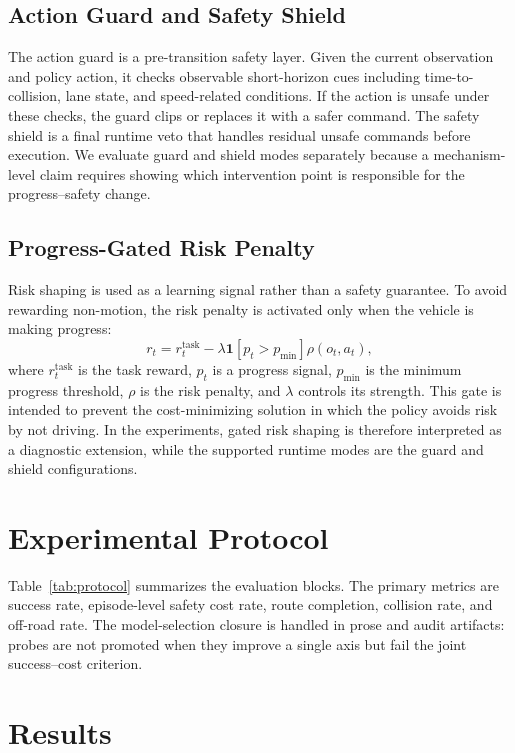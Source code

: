 \documentclass[conference,a4paper]{IEEEtran}
\begin{document}
\subsection{Action Guard and Safety Shield}
The action guard is a pre-transition safety layer. Given the current observation and policy action, it checks observable short-horizon cues including time-to-collision, lane state, and speed-related conditions. If the action is unsafe under these checks, the guard clips or replaces it with a safer command. The safety shield is a final runtime veto that handles residual unsafe commands before execution. We evaluate guard and shield modes separately because a mechanism-level claim requires showing which intervention point is responsible for the progress--safety change.

\subsection{Progress-Gated Risk Penalty}
Risk shaping is used as a learning signal rather than a safety guarantee. To avoid rewarding non-motion, the risk penalty is activated only when the vehicle is making progress:
\begin{equation}
 r_t = r_t^{\mathrm{task}} - \lambda \mathbf{1}[p_t > p_{\min}]\rho(o_t,a_t),
 \label{eq:gated-risk}
\end{equation}
where $r_t^{\mathrm{task}}$ is the task reward, $p_t$ is a progress signal, $p_{\min}$ is the minimum progress threshold, $\rho$ is the risk penalty, and $\lambda$ controls its strength. This gate is intended to prevent the cost-minimizing solution in which the policy avoids risk by not driving. In the experiments, gated risk shaping is therefore interpreted as a diagnostic extension, while the supported runtime modes are the guard and shield configurations.

\section{Experimental Protocol}
Table~\ref{tab:protocol} summarizes the evaluation blocks. The primary metrics are success rate, episode-level safety cost rate, route completion, collision rate, and off-road rate. The model-selection closure is handled in prose and audit artifacts: probes are not promoted when they improve a single axis but fail the joint success--cost criterion.


\section{Results}
\end{document}
